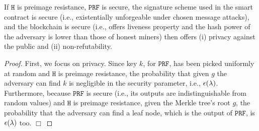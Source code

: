 \begin{theorem}
If  $\mathtt{H}$ is preimage resistance, $\mathtt{PRF}$ is secure, the signature scheme used in the smart contract is secure (i.e., existentially unforgeable under chosen message attacks), and the blockchain is secure (i.e., offers liveness property and the hash power of the adversary is lower than those of honest miners) then \zspa offers (i) privacy against the public and (ii) non-refutability. 
\end{theorem}
 
 

\begin{proof}
First, we focus on privacy. Since key $k$, for $\mathtt{PRF}$, has been picked uniformly at random and $\mathtt{H}$ is preimage resistance, the probability that given $g$ the adversary can find $k$ is negligible in the security parameter, i.e., $\epsilon(\lambda)$. Furthermore, because $\mathtt{PRF}$ is secure (i.e., its outputs are indistinguishable from random values) and  $\mathtt{H}$ is preimage resistance, given the Merkle tree's root $g$, the probability that the adversary can find a leaf node, which is the output of $\mathtt{PRF}$, is $\epsilon(\lambda)$ too. 
  \hfill\(\Box\)\end{proof}











